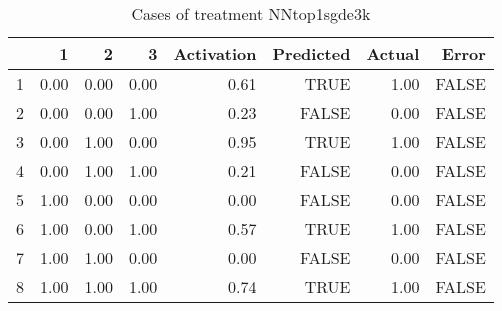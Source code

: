 \begin{table}[ht]
\centering
\begin{tabular}{rrrrrrrr}
  \hline
 & 1 & 2 & 3 & Activation & Predicted & Actual & Error \\ 
  \hline
1 & 0.00 & 0.00 & 0.00 & 0.61 & TRUE & 1.00 & FALSE \\ 
  2 & 0.00 & 0.00 & 1.00 & 0.23 & FALSE & 0.00 & FALSE \\ 
  3 & 0.00 & 1.00 & 0.00 & 0.95 & TRUE & 1.00 & FALSE \\ 
  4 & 0.00 & 1.00 & 1.00 & 0.21 & FALSE & 0.00 & FALSE \\ 
  5 & 1.00 & 0.00 & 0.00 & 0.00 & FALSE & 0.00 & FALSE \\ 
  6 & 1.00 & 0.00 & 1.00 & 0.57 & TRUE & 1.00 & FALSE \\ 
  7 & 1.00 & 1.00 & 0.00 & 0.00 & FALSE & 0.00 & FALSE \\ 
  8 & 1.00 & 1.00 & 1.00 & 0.74 & TRUE & 1.00 & FALSE \\ 
   \hline
\end{tabular}
\caption{Cases of treatment NNtop1sgde3k} 
\end{table}

